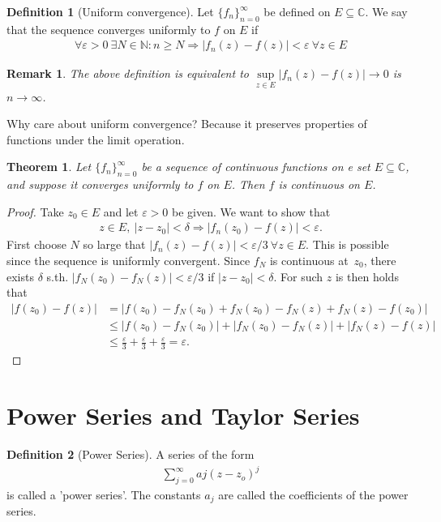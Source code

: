 \documentclass[12pt, a4paper]{article}
\theoremstyle{plain}
\newtheorem{thm}{Theorem} %
\newtheorem{rem}{Remark}
\theoremstyle{definition}
\newtheorem{definition}{Definition} %
\begin{document}
			\begin{definition}[Uniform convergence]
				Let $\{f_n\}_{n=0}^{\infty}$ be defined on $E\subseteq \mathbb{C}$. We say that the sequence converges uniformly to $f$ on $E$ if 
				\begin{align*}
					\forall \varepsilon>0\:\exists N\in \mathbb{N}: n\ge N\Rightarrow |f_n(z)-f(z)|<\varepsilon\:\forall z\in E
				\end{align*}
			\end{definition}

			\begin{rem}
				The above definition is equivalent to $\sup\limits_{z\in E}|f_n(z)-f(z)|\to 0$ is $n\to\infty$.
			\end{rem}

			Why care about uniform convergence? Because it preserves properties of functions under the limit operation.

			\begin{thm}
				Let $\{f_n\}_{n=0}^{\infty}$ be a sequence of continuous functions on e set $E\subseteq \mathbb{C}$, and suppose it converges uniformly to $f$ on $E$. Then $f$ is continuous on $E$.
			\end{thm}

			\begin{proof}
				Take $z_0\in E$ and let $\varepsilon>0$ be given. We want to show that
				\begin{align*}
					z\in E,\:|z-z_0|< \delta\Rightarrow |f_n(z_0)-f(z)|<\varepsilon.
				\end{align*}
				First choose $N$ so large that $|f_n(z)-f(z)|<\varepsilon/3\:\forall z\in E$. This is possible since the sequence is uniformly convergent. Since $f_N$ is continuous at $z_0$, there exists $\delta$ s.th. $|f_N(z_0)-f_N(z)|<\varepsilon/3$ if $|z-z_0|<\delta$. For such $z$ is then holds that
				\begin{align*}
					|f(z_0)-f(z)| &= |f(z_0)-f_N(z_0)+f_N(z_0)-f_N(z)+f_N(z)-f(z_0)|\\ &\le
					|f(z_0)-f_N(z_0)| + |f_N(z_0)-f_N(z)| + |f_N(z)-f(z)|\\ &\le
					\frac{\varepsilon}{3}+\frac{\varepsilon}{3}+\frac{\varepsilon}{3} = \varepsilon.
				\end{align*}
			\end{proof}
	\section{Power Series and Taylor Series} %
	\label{sec:power_series_and_taylor_series}
		\begin{definition}[Power Series]
			A series of the form
			\begin{align*}
				\sum\limits_{j=0}^{\infty}aj(z-z_o)^j
			\end{align*}
			is called a 'power series'. The constants $a_j$ are called the coefficients of the power series.\\
		\end{definition}
\end{document}

